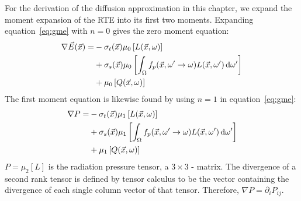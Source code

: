 For the derivation of the diffusion approximation in this chapter, we expand the moment expansion of the RTE into its first two moments. Expanding equation~\ref{eq:gme} with $n=0$ gives the zero moment equation:
\begin{align}
\nonumber
\nabla\vec{E}(\vec{x})=&
-\sigma_t(\vec{x})\mu_0\left[L(\vec{x}, \omega)\right]
\\
\label{eq:p1_zero}
&+ \sigma_s(\vec{x})\mu_0\left[\int_{\Omega}f_p(\vec{x}, \omega'\rightarrow\omega)L(\vec{x}, \omega')\,\mathrm{d}\omega'\right] 
\\
\nonumber
&+ \mu_0\left[Q(\vec{x}, \omega)\right]
\end{align}
The first moment equation is likewise found by using $n=1$ in equation~\ref{eq:gme}:
\begin{align}
\nonumber
\nabla P =&
-\sigma_t(\vec{x})\mu_1\left[L(\vec{x}, \omega)\right]
\\ &
\label{eq:p1_firstme}
+\sigma_s(\vec{x})\mu_1\left[\int_{\Omega}f_p(\vec{x}, \omega'\rightarrow\omega)L(\vec{x}, \omega')\,\mathrm{d}\omega'\right]
\\ &
\nonumber
+ \mu_1\left[Q(\vec{x}, \omega)\right]
\end{align}
$P=\mu_2[L]$ is the radiation pressure tensor, a $3\times3$ - matrix. The divergence of a second rank tensor is defined by tensor calculus to be the vector containing the divergence of each single column vector of that tensor. Therefore, $\nabla P = \partial_i P_{ij}$.

